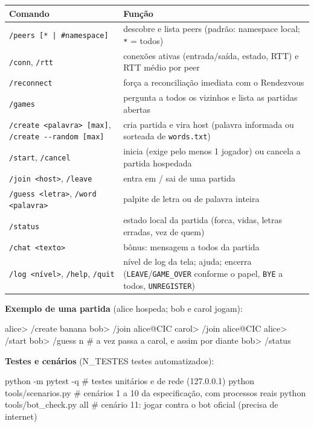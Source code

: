 \documentclass[11pt,a4paper]{article}
\begin{document}
\begin{tabularx}{\textwidth}{@{}P{5.6cm}Y@{}}
\toprule
\textbf{Comando} & \textbf{Função}\\
\midrule
\texttt{/peers [* | \#namespace]} & descobre e lista peers (padrão: namespace local; \texttt{*} = todos)\\
\texttt{/conn}, \texttt{/rtt} & conexões ativas (entrada/saída, estado, RTT) e RTT médio por peer\\
\texttt{/reconnect} & força a reconciliação imediata com o Rendezvous\\
\texttt{/games} & pergunta a todos os vizinhos e lista as partidas abertas\\
\texttt{/create <palavra> [max]}, \texttt{/create -{}-random [max]} & cria partida e vira host (palavra informada ou sorteada de \texttt{words.txt})\\
\texttt{/start}, \texttt{/cancel} & inicia (exige pelo menos 1 jogador) ou cancela a partida hospedada\\
\texttt{/join <host>}, \texttt{/leave} & entra em / sai de uma partida\\
\texttt{/guess <letra>}, \texttt{/word <palavra>} & palpite de letra ou de palavra inteira\\
\texttt{/status} & estado local da partida (forca, vidas, letras erradas, vez de quem)\\
\texttt{/chat <texto>} & bônus: mensagem a todos da partida\\
\texttt{/log <nível>}, \texttt{/help}, \texttt{/quit} & nível de log da tela; ajuda; encerra (\texttt{LEAVE}/\texttt{GAME\_OVER} conforme o papel, \texttt{BYE} a todos, \texttt{UNREGISTER})\\
\bottomrule
\end{tabularx}

\textbf{Exemplo de uma partida} (alice hospeda; bob e carol jogam):
\begin{codigo}
alice> /create banana
bob>   /join alice@CIC        carol> /join alice@CIC
alice> /start
bob>   /guess n               # a vez passa a carol, e assim por diante
bob>   /status
\end{codigo}
\textbf{Testes e cenários} ({{N_TESTES}} testes automatizados):
\begin{codigo}
python -m pytest -q                 # testes unitários e de rede (127.0.0.1)
python tools/scenarios.py           # cenários 1 a 10 da especificação, com processos reais
python tools/bot_check.py all       # cenário 11: jogar contra o bot oficial (precisa de internet)
\end{codigo}
\end{document}
